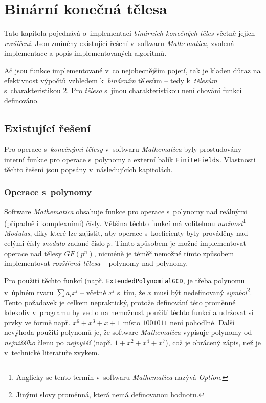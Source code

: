 \documentclass[thesis=M,czech,hidelinks]{FITthesis}[2012/06/26]
\newcommand{\0}{{\textcolor[gray]{0.100}{0}}}
\begin{document}
\section{Binární konečná tělesa}
Tato kapitola pojednává o~implementaci \emph{binárních konečných těles} včetně
jejich \emph{rozšíření}. Jsou zmíněny existující řešení v~softwaru
\emph{Mathematica}, zvolená implementace a popis implementovaných algoritmů.

Ač jsou funkce implementované v~co nejobecnějším pojetí, tak je kladen důraz na
efektivnost výpočtů vzhledem k~\emph{binárním} tělesům -- tedy k~\emph{tělesům}
s~charakteristikou $2$. Pro \emph{tělesa} s~jinou charakteristikou není chování
funkcí definováno.

\subsection{Existující řešení}
Pro operace s~\emph{konečnými tělesy} v~softwaru \emph{Mathematica} byly
prostudovány interní funkce pro operace s~polynomy a externí balík
\texttt{FiniteFields}. Vlastnosti těchto řešení jsou popsány v~následujících
kapitolách.

\subsubsection{Operace s~polynomy}
Software \emph{Mathematica} obsahuje funkce pro operace s~polynomy nad reálnými
(případně i komplexními) čísly. Většina těchto funkcí má volitelnou
\emph{možnost}\footnote{
Anglicky se tento termín v~softwaru \emph{Mathematica}
nazývá \emph{Option}.
} \emph{Modulus}, díky které lze zajistit, aby operace s~koeficienty byly prováděny
nad celými čísly \emph{modulo} zadané číslo $p$. Tímto způsobem je možné
implementovat operace nad tělesy $GF(p^n)$, nicméně je téměř nemožné
tímto způsobem implementovat \emph{rozšířená tělesa} -- polynomy nad polynomy.

Pro použití těchto funkcí (např. \texttt{ExtendedPolynomialGCD}, je třeba
polynomu v~úplném tvaru $\sum a_i x^i$ -- včetně $x^i$ s~tím, že $x$ musí být
nedefinovaný \emph{symbol}\footnote{
Jinými slovy proměnná, která nemá definovanou hodnotu.
}. Tento požadavek je celkem nepraktický, protože definování této proměnné
kdekoliv v~programu by vedlo na nemožnost použití těchto funkcí a udržovat si
prvky ve formě např. $x^6 + x^3 + x + 1$ místo $1001011$ není pohodlné.
Další nevýhoda použití polynomů je, že software \emph{Mathematica} vypisuje
polynomy od \emph{nejnižšího} členu po \emph{nejvyšší} (např. $1+x^2+x^4+x^7$),
což je obrácený zápis, než je v~technické literatuře zvykem.
\end{document}
